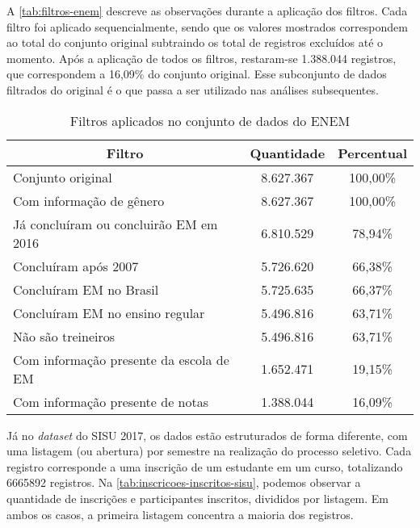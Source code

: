 A \autoref{tab:filtros-enem} descreve as observações durante a aplicação dos filtros. Cada filtro foi aplicado sequencialmente, sendo que os valores mostrados correspondem ao total do conjunto original subtraindo os total de registros excluídos até o momento. Após a aplicação de todos os filtros, restaram-se 1.388.044 registros, que correspondem a 16,09\% do conjunto original. Esse subconjunto de dados filtrados do original é o que passa a ser utilizado nas análises subsequentes.

\begin{table}[h]
  \begin{tabular}{lcc}
  \hline
  \multicolumn{1}{c}{\textbf{Filtro}}     & \textbf{Quantidade} & \textbf{Percentual} \\ \hline
  Conjunto original                       & 8.627.367             & 100,00\%            \\ \hline
  Com informação de gênero                & 8.627.367             & 100,00\%            \\ \hline
  Já concluíram ou concluirão EM em 2016  & 6.810.529             & 78,94\%             \\ \hline
  Concluíram após 2007                    & 5.726.620             & 66,38\%             \\ \hline
  Concluíram EM no Brasil                 & 5.725.635             & 66,37\%             \\ \hline
  Concluíram EM no ensino regular         & 5.496.816             & 63,71\%             \\ \hline
  Não são treineiros                      & 5.496.816             & 63,71\%             \\ \hline
  Com informação presente da escola de EM & 1.652.471             & 19,15\%             \\ \hline
  Com informação presente de notas        & 1.388.044             & 16,09\%             \\ \hline
  \end{tabular}
  \caption{Filtros aplicados no conjunto de dados do ENEM}
  \label{tab:filtros-enem}
  \end{table}

Já no \textit{dataset} do SISU 2017, os dados estão estruturados de forma diferente, com uma listagem (ou abertura) por semestre na realização do processo seletivo. Cada registro corresponde a uma inscrição de um estudante em um curso, totalizando 6665892 registros. Na \autoref{tab:inscricoes-inscritos-sisu}, podemos observar a quantidade de inscrições e participantes inscritos, divididos por listagem. Em ambos os casos, a primeira listagem concentra a maioria dos registros.

